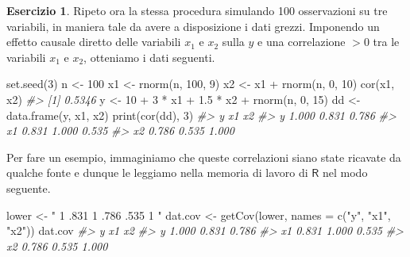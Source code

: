 \documentclass[
  11pt,
]{krantz}
\makeatletter
\newenvironment{Shaded}{\begin{snugshade}}{\end{snugshade}}
\newcommand{\AttributeTok}[1]{\textcolor[rgb]{0.61,0.61,0.61}{#1}}
\newcommand{\CommentTok}[1]{\textcolor[rgb]{0.37,0.37,0.37}{\textit{#1}}}
\newcommand{\DecValTok}[1]{\textcolor[rgb]{0.06,0.06,0.06}{#1}}
\newcommand{\FloatTok}[1]{\textcolor[rgb]{0.06,0.06,0.06}{#1}}
\newcommand{\FunctionTok}[1]{\textcolor[rgb]{0,0,0}{#1}}
\newcommand{\NormalTok}[1]{#1}
\newcommand{\OtherTok}[1]{\textcolor[rgb]{0.37,0.37,0.37}{#1}}
\newcommand{\SpecialCharTok}[1]{\textcolor[rgb]{0,0,0}{#1}}
\newcommand{\StringTok}[1]{\textcolor[rgb]{0.5,0.5,0.5}{#1}}
\newenvironment{kframe}{%
\medskip{}
\setlength{\fboxsep}{.8em}
 \def\at@end@of@kframe{}%
 \ifinner\ifhmode%
  \def\at@end@of@kframe{\end{minipage}}%
  \begin{minipage}{\columnwidth}%
 \fi\fi%
 \def\FrameCommand##1{\hskip\@totalleftmargin \hskip-\fboxsep
 \colorbox{shadecolor}{##1}\hskip-\fboxsep
     \hskip-\linewidth \hskip-\@totalleftmargin \hskip\columnwidth}%
 \MakeFramed {\advance\hsize-\width
   \@totalleftmargin\z@ \linewidth\hsize
   \@setminipage}}%
 {\par\unskip\endMakeFramed%
 \at@end@of@kframe}
\renewenvironment{Shaded}{\begin{kframe}}{\end{kframe}}
\theoremstyle{definition}
\theoremstyle{definition}
\theoremstyle{definition}
\newtheorem{exercise}{Esercizio}[chapter]
\theoremstyle{definition}
\theoremstyle{remark}
\makeatother
\begin{document}
\begin{exercise}

Ripeto ora la stessa procedura simulando 100 osservazioni su tre variabili, in maniera tale da avere a disposizione i dati grezzi. Imponendo un effetto causale diretto delle variabili \(x_1\) e \(x_2\) sulla \(y\) e una correlazione \(> 0\) tra le variabili \(x_1\) e \(x_2\), otteniamo i dati seguenti.

\begin{Shaded}
\begin{Highlighting}[]
\FunctionTok{set.seed}\NormalTok{(}\DecValTok{3}\NormalTok{)}
\NormalTok{n }\OtherTok{\textless{}{-}} \DecValTok{100}
\NormalTok{x1 }\OtherTok{\textless{}{-}} \FunctionTok{rnorm}\NormalTok{(n, }\DecValTok{100}\NormalTok{, }\DecValTok{9}\NormalTok{)}
\NormalTok{x2 }\OtherTok{\textless{}{-}}\NormalTok{ x1 }\SpecialCharTok{+} \FunctionTok{rnorm}\NormalTok{(n, }\DecValTok{0}\NormalTok{, }\DecValTok{10}\NormalTok{)}
\FunctionTok{cor}\NormalTok{(x1, x2)}
\CommentTok{\#\textgreater{} [1] 0.5346}
\NormalTok{y }\OtherTok{\textless{}{-}} \DecValTok{10} \SpecialCharTok{+} \DecValTok{3} \SpecialCharTok{*}\NormalTok{ x1 }\SpecialCharTok{+} \FloatTok{1.5} \SpecialCharTok{*}\NormalTok{ x2 }\SpecialCharTok{+} \FunctionTok{rnorm}\NormalTok{(n, }\DecValTok{0}\NormalTok{, }\DecValTok{15}\NormalTok{)}
\NormalTok{dd }\OtherTok{\textless{}{-}} \FunctionTok{data.frame}\NormalTok{(y, x1, x2)}
\FunctionTok{print}\NormalTok{(}\FunctionTok{cor}\NormalTok{(dd), }\DecValTok{3}\NormalTok{)}
\CommentTok{\#\textgreater{}        y    x1    x2}
\CommentTok{\#\textgreater{} y  1.000 0.831 0.786}
\CommentTok{\#\textgreater{} x1 0.831 1.000 0.535}
\CommentTok{\#\textgreater{} x2 0.786 0.535 1.000}
\end{Highlighting}
\end{Shaded}

Per fare un esempio, immaginiamo che queste correlazioni siano state ricavate da qualche fonte e dunque le leggiamo nella memoria di lavoro di \(\mathsf{R}\) nel modo seguente.

\begin{Shaded}
\begin{Highlighting}[]
\NormalTok{lower }\OtherTok{\textless{}{-}} \StringTok{"}
\StringTok{ 1}
\StringTok{ .831 1}
\StringTok{ .786 .535 1}
\StringTok{"}
\NormalTok{dat.cov }\OtherTok{\textless{}{-}} \FunctionTok{getCov}\NormalTok{(lower, }\AttributeTok{names =} \FunctionTok{c}\NormalTok{(}\StringTok{"y"}\NormalTok{, }\StringTok{"x1"}\NormalTok{, }\StringTok{"x2"}\NormalTok{))}
\NormalTok{dat.cov}
\CommentTok{\#\textgreater{}        y    x1    x2}
\CommentTok{\#\textgreater{} y  1.000 0.831 0.786}
\CommentTok{\#\textgreater{} x1 0.831 1.000 0.535}
\CommentTok{\#\textgreater{} x2 0.786 0.535 1.000}
\end{Highlighting}
\end{Shaded}


\end{exercise}
\end{document}
